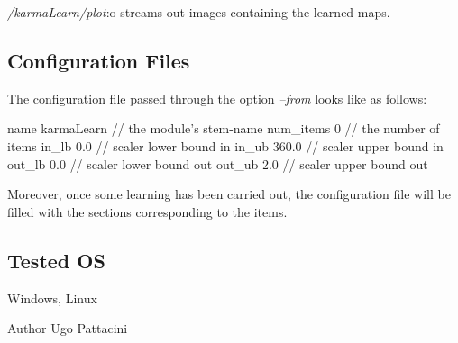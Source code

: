 {\itshape /karma\+Learn/plot}\+:o streams out images containing the learned maps.\hypertarget{group__karmaLearn_conf_file_sec}{}\subsection{Configuration Files}\label{group__karmaLearn_conf_file_sec}
The configuration file passed through the option {\itshape --from} looks like as follows\+:


\begin{DoxyCode}
[general]
name      karmaLearn    \textcolor{comment}{// the module's stem-name}
num\_items 0             \textcolor{comment}{// the number of items }
in\_lb     0.0           \textcolor{comment}{// scaler lower bound in}
in\_ub     360.0         \textcolor{comment}{// scaler upper bound in }
out\_lb    0.0           \textcolor{comment}{// scaler lower bound out}
out\_ub    2.0           \textcolor{comment}{// scaler upper bound out}
\end{DoxyCode}


Moreover, once some learning has been carried out, the configuration file will be filled with the sections corresponding to the items.\hypertarget{group__karmaToolProjection_tested_os_sec}{}\subsection{Tested OS}\label{group__karmaToolProjection_tested_os_sec}
Windows, Linux

\begin{DoxyAuthor}{Author}
Ugo Pattacini 
\end{DoxyAuthor}
